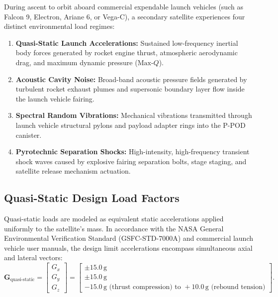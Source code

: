 During ascent to orbit aboard commercial expendable launch vehicles (such as Falcon 9, Electron, Ariane 6, or Vega-C), a secondary satellite experiences four distinct environmental load regimes:
\begin{enumerate}
\item \textbf{Quasi-Static Launch Accelerations:} Sustained low-frequency inertial body forces generated by rocket engine thrust, atmospheric aerodynamic drag, and maximum dynamic pressure ($\text{Max-}Q$).
\item \textbf{Acoustic Cavity Noise:} Broad-band acoustic pressure fields generated by turbulent rocket exhaust plumes and supersonic boundary layer flow inside the launch vehicle fairing.
\item \textbf{Spectral Random Vibrations:} Mechanical vibrations transmitted through launch vehicle structural pylons and payload adapter rings into the P-POD canister.
\item \textbf{Pyrotechnic Separation Shocks:} High-intensity, high-frequency transient shock waves caused by explosive fairing separation bolts, stage staging, and satellite release mechanism actuation.
\end{enumerate}

\subsection{Quasi-Static Design Load Factors}

Quasi-static loads are modeled as equivalent static accelerations applied uniformly to the satellite's mass. In accordance with the NASA General Environmental Verification Standard (GSFC-STD-7000A) and commercial launch vehicle user manuals, the design limit accelerations encompass simultaneous axial and lateral vectors:
\begin{equation}
\mathbf{G}_{\text{quasi-static}} = 
\begin{bmatrix}
G_x \\
G_y \\
G_z
\end{bmatrix} =
\begin{bmatrix}
\pm 15.0\,\text{g} \\
\pm 15.0\,\text{g} \\
-15.0\,\text{g} \text{ (thrust compression)} \text{ to } +10.0\,\text{g} \text{ (rebound tension)}
\end{bmatrix}.
\label{eq:quasi_static_vector}
\end{equation}


